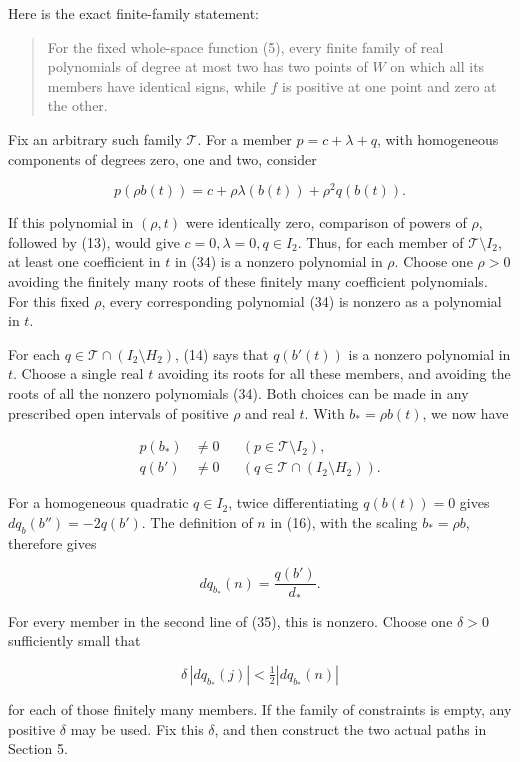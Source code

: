 \documentclass[11pt]{article}
\begin{document}
Here is the exact finite-family statement:

\begin{quote}
For the fixed whole-space function (5), every finite family of real
polynomials of degree at most two has two points of \(W\) on which all its
members have identical signs, while \(f\) is positive at one point and
zero at the other.
\end{quote}

Fix an arbitrary such family \(\mathcal T\). For a member
\(p=c+\lambda+q\), with homogeneous components of degrees zero, one and two,
consider

\[
p(\rho b(t))=c+\rho\lambda(b(t))+\rho^2q(b(t)).
\tag{34}
\]

If this polynomial in \((\rho,t)\) were identically zero, comparison of
powers of \(\rho\), followed by (13), would give
\(c=0,\lambda=0,q\in I_2\). Thus, for each member of
\(\mathcal T\setminus I_2\), at least one coefficient in \(t\) in (34)
is a nonzero polynomial in \(\rho\). Choose one \(\rho>0\) avoiding the
finitely many roots of these finitely many coefficient polynomials. For
this fixed \(\rho\), every corresponding polynomial (34) is nonzero as a
polynomial in \(t\).

For each \(q\in\mathcal T\cap(I_2\setminus H_2)\), (14) says that
\(q(b'(t))\) is a nonzero polynomial in \(t\). Choose a single real \(t\)
avoiding its roots for all these members, and avoiding the roots of all the
nonzero polynomials (34). Both choices can be made in any prescribed open
intervals of positive \(\rho\) and real \(t\). With \(b_*=\rho b(t)\),
we now have

\[
\begin{aligned}
p(b_*)&\ne0&& (p\in\mathcal T\setminus I_2),\\
q(b')&\ne0&& (q\in\mathcal T\cap(I_2\setminus H_2)).
\end{aligned}
\tag{35}
\]

For a homogeneous quadratic \(q\in I_2\), twice differentiating
\(q(b(t))=0\) gives \(dq_b(b'')=-2q(b')\). The definition of \(n\) in
(16), with the scaling \(b_*=\rho b\), therefore gives

\[
dq_{b_*}(n)=\frac{q(b')}{d_*}.
\tag{36}
\]

For every member in the second line of (35), this is nonzero. Choose one
\(\delta>0\) sufficiently small that

\[
\delta\,|dq_{b_*}(j)|
 <\tfrac12|dq_{b_*}(n)|
\tag{37}
\]

for each of those finitely many members. If the family of constraints is
empty, any positive \(\delta\) may be used. Fix this \(\delta\), and then
construct the two actual paths in Section 5.
\end{document}
